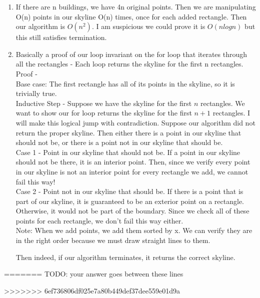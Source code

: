 \documentclass{article}
\begin{document}
\begin{enumerate}
\begin{algorithm}
\begin{algorithmic}[h]
		\end{algorithmic}
                \end{algorithm}
	\item  If there are n buildings, we have 4n original points. Then we are manipulating O(n) points in our skyline O(n) times, once for each added rectangle. Then our algorithm is $O(n^2)$. I am suspicious we could prove it is $O(nlogn)$ but this still satisfies termination.
	\item Basically a proof of our loop invariant on the for loop that iterates through all the rectangles - Each loop returns the skyline for the first n rectangles. Proof - \\
		Base case: The first rectangle has all of its points in the skyline, so it is trivially true. \\
		Inductive Step - Suppose we have the skyline for the first $n$ rectangles. We want to show our for loop returns the skyline for the first $n+1$ rectangles. I will make this logical jump with contradiction. Suppose our algorithm did not return the proper skyline. Then either there is a point in our skyline that should not be, or there is a point not in our skyline that should be. \\
		Case 1 - Point in our skyline that should not be. If a point in our skyline should not be there, it is an interior point. Then, since we verify every point in our skyline is not an interior point for every rectangle we add, we cannot fail this way!\\

		Case 2 - Point not in our skyline that should be. If there is a point that is part of our skyline, it is guaranteed to be an exterior point on a rectangle. Otherwise, it would not be part of the boundary. Since we check all of these points for each rectangle, we don't fail this way either.\\
		Note: When we add points, we add them sorted by x. We can verify they are in the right order because we must draw straight lines to them. 
		
		Then indeed, if our algorithm terminates, it returns the correct skyline.

        		
\end{enumerate}
=======
TODO: your answer goes between these lines

>>>>>>> 6ef736806df025e7a80b449def37dee559e01d9a
\end{document}
